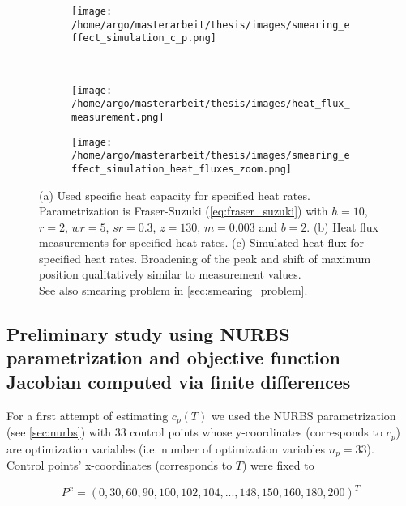 \documentclass{scrartcl}[12pt, halfparskip]
\numberwithin{equation}{section}
\numberwithin{figure}{section}
\numberwithin{table}{section}
\begin{document}
\begin{figure}[H]
	\centering
	\begin{subfigure}{0.9\textwidth}
		\centering
		\texttt{[image: /home/argo/masterarbeit/thesis/images/smearing\_effect\_simulation\_c\_p.png]}
		\caption{}
		\label{fig:smearing_effect_c_p}
	\end{subfigure} \\
	\begin{subfigure}{0.49\textwidth}
		\texttt{[image: /home/argo/masterarbeit/thesis/images/heat\_flux\_measurement.png]}
		\caption{}
		\label{fig:smearing_effect_measurement_heat_flux}
	\end{subfigure}
	\begin{subfigure}{0.49\textwidth}
		\texttt{[image: /home/argo/masterarbeit/thesis/images/smearing\_effect\_simulation\_heat\_fluxes\_zoom.png]}
		\caption{}
		\label{fig:smearing_effect_simulation_heat_flux}
	\end{subfigure}
	\caption{(a) Used specific heat capacity for specified heat rates. Parametrization is Fraser-Suzuki (\cref{eq:fraser_suzuki}) with $h=10$, $r=2$, $wr=5$, $sr=0.3$, $z=130$, $m=0.003$ and $b=2$. (b) Heat flux measurements for specified heat rates. (c) Simulated heat flux for specified heat rates. Broadening of the peak and shift of maximum position qualitatively similar to measurement values. \\
	See also smearing problem in \cref{sec:smearing_problem}.}
\end{figure}



\subsection{Preliminary study using NURBS parametrization and objective function Jacobian computed via finite differences}
\label{sec:param_estim_NURBS}

For a first attempt of estimating $c_p(T)$  we used the NURBS parametrization (see \cref{sec:nurbs}) with 33 control points whose y-coordinates (corresponds to $c_p$) are optimization variables (i.e. number of optimization variables $n_p=33$). Control points' x-coordinates (corresponds to $T$) were fixed to 

\begin{equation}
	P^x = (0, 30, 60, 90, 100, 102, 104, ..., 148, 150, 160, 180, 200)^T
\end{equation}
\end{document}
